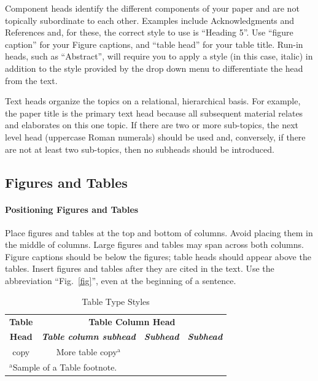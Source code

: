 \documentclass[conference]{IEEEtran}
\begin{document}
Component heads identify the different components of your paper and are not 
topically subordinate to each other. Examples include Acknowledgments and 
References and, for these, the correct style to use is ``Heading 5''. Use 
``figure caption'' for your Figure captions, and ``table head'' for your 
table title. Run-in heads, such as ``Abstract'', will require you to apply a 
style (in this case, italic) in addition to the style provided by the drop 
down menu to differentiate the head from the text.

Text heads organize the topics on a relational, hierarchical basis. For 
example, the paper title is the primary text head because all subsequent 
material relates and elaborates on this one topic. If there are two or more 
sub-topics, the next level head (uppercase Roman numerals) should be used 
and, conversely, if there are not at least two sub-topics, then no subheads 
should be introduced.

\subsection{Figures and Tables}
\paragraph{Positioning Figures and Tables} Place figures and tables at the top and 
bottom of columns. Avoid placing them in the middle of columns. Large 
figures and tables may span across both columns. Figure captions should be 
below the figures; table heads should appear above the tables. Insert 
figures and tables after they are cited in the text. Use the abbreviation 
``Fig.~\ref{fig}'', even at the beginning of a sentence.

\begin{table}[htbp]
\caption{Table Type Styles}
\begin{center}
\begin{tabular}{|c|c|c|c|}
\hline
\textbf{Table}&\multicolumn{3}{|c|}{\textbf{Table Column Head}} \\
\cline{2-4} 
\textbf{Head} & \textbf{\textit{Table column subhead}}& \textbf{\textit{Subhead}}& \textbf{\textit{Subhead}} \\
\hline
copy& More table copy$^{\mathrm{a}}$& &  \\
\hline
\multicolumn{4}{l}{$^{\mathrm{a}}$Sample of a Table footnote.}
\end{tabular}
\label{tab1}
\end{center}
\end{table}
\end{document}
